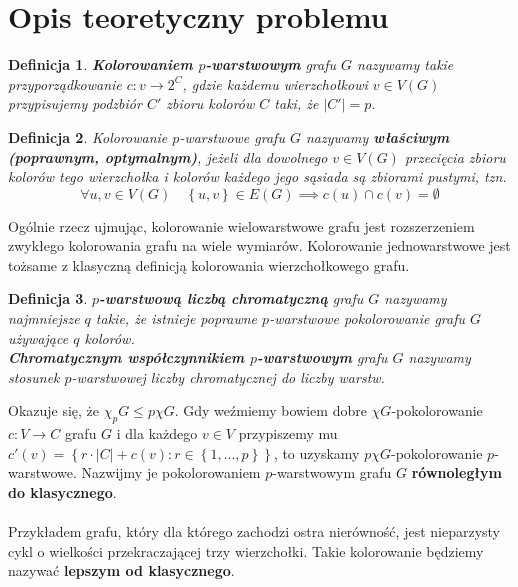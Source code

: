 \documentclass[10pt,a4paper]{article}
\newtheorem{definition}{Definicja}
\begin{document}
	\section{Opis teoretyczny problemu}
	
	\begin{definition}\label{def:1}
		\textbf{Kolorowaniem $p$-warstwowym} grafu $G$ nazywamy takie przyporządkowanie $c: v \rightarrow 2^{C}$, gdzie każdemu wierzchołkowi $v \in V(G)$ przypisujemy podzbiór $C'$ zbioru kolorów $C$ taki, że $|C'| = p$.
	\end{definition}

	\begin{definition}\label{def:2}
		Kolorowanie $p$-warstwowe grafu $G$ nazywamy \textbf{właściwym (poprawnym, optymalnym)}, jeżeli dla dowolnego $v \in V(G)$ przecięcia zbioru kolorów tego wierzchołka i kolorów każdego jego sąsiada są zbiorami pustymi, tzn.
		\[ \forall u, v \in V(G) \quad \left\{u, v\right\} \in E(G) \implies c(u) \cap c(v) = \emptyset \]
	\end{definition}

	Ogólnie rzecz ujmując, kolorowanie wielowarstwowe grafu jest rozszerzeniem zwykłego kolorowania grafu na wiele wymiarów. Kolorowanie jednowarstwowe jest tożsame z klasyczną definicją kolorowania wierzchołkowego grafu.
	
	\begin{definition}
		\textbf{$p$-warstwową liczbą chromatyczną} grafu $G$ nazywamy najmniejsze $q$ takie, że istnieje poprawne $p$-warstwowe pokolorowanie grafu $G$ używające $q$ kolorów.\\
		\textbf{Chromatycznym współczynnikiem $p$-warstwowym} grafu $G$ nazywamy stosunek $p$-warstwowej liczby chromatycznej do liczby warstw.
	\end{definition}

	Okazuje się, że $\chi_{p}G \leq p \chi G$. Gdy weźmiemy bowiem dobre $\chi G$-pokolorowanie $c: V \rightarrow C$ grafu $G$ i dla każdego $v \in V$ przypiszemy mu $c'(v) = \left\{r \cdot |C| + c(v): r \in \left\{1,...,p\right\}\right\}$, to uzyskamy $p \chi G$-pokolorowanie $p$-warstwowe. Nazwijmy je pokolorowaniem $p$-warstwowym grafu $G$ \textbf{równoległym do klasycznego}.
	\\~\\
	Przykładem grafu, który dla którego zachodzi ostra nierówność, jest nieparzysty cykl o wielkości przekraczającej trzy wierzchołki. Takie kolorowanie będziemy nazywać \textbf{lepszym od klasycznego}.
	
\end{document}
